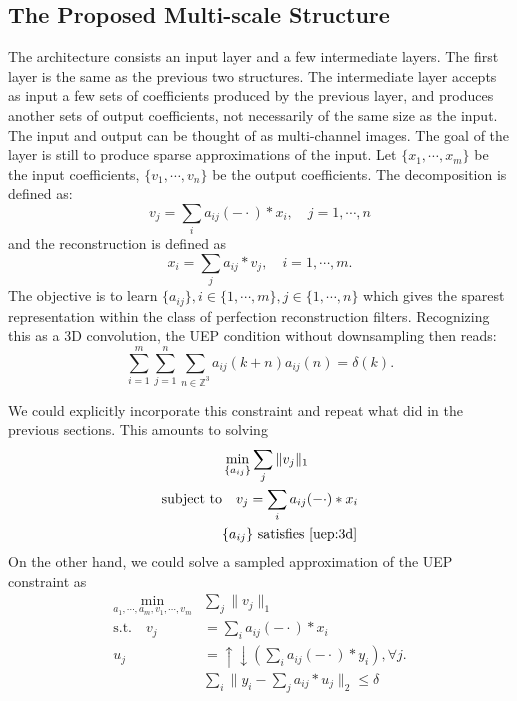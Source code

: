 \documentclass[a4paper]{article}
\begin{document}
\subsection{The Proposed Multi-scale Structure}
The architecture consists an input layer and a few intermediate layers. The first layer is the same as the previous two structures. The intermediate layer accepts as input a few sets of coefficients produced by the previous layer, and produces another sets of output coefficients, not necessarily of the same size as the input. The input and output can be thought of as multi-channel images. The goal of the layer is still to produce sparse approximations of the input. Let $\{x_1,\cdots,x_m\}$ be the input coefficients, $\{v_1,\cdots,v_n\}$ be the output coefficients. The decomposition is defined as:
\begin{equation}
	v_j = \sum_i a_{ij}(-\cdot)*x_i,\quad j=1,\cdots,n
\end{equation}
and the reconstruction is defined as 
\begin{equation}
	x_i = \sum_j a_{ij}*v_j, \quad i=1,\cdots, m.
\end{equation}
The objective is to learn $\{a_{ij}\}, i\in \{1,\cdots,m\}, j\in \{1,\cdots, n\}$ which gives the sparest representation within the class of perfection reconstruction filters. Recognizing this as a 3D convolution, the UEP condition without downsampling then reads:
\begin{equation}
\label{uep:3d}
	\sum_{i=1}^m\sum_{j=1}^n  \sum_{n\in \mathbb{Z}^3} a_{ij}(k+n)a_{ij}(n) = \delta(k).
\end{equation}

We could explicitly incorporate this constraint and repeat what did in the previous sections. This amounts to solving
\begin{equation}
	\begin{aligned}
		&\min_{ \{a_{ij}\} } \sum_j \|v_j\|_1 \\
		\textrm{subject to} &\quad v_j = \sum_i a_{ij}(-\cdot)*x_i \\
			&\{a_{ij}\} \textrm{ satisfies \eqref{uep:3d}} \\
	\end{aligned}
\end{equation}
On the other hand, we could solve a sampled approximation of the UEP constraint as
\begin{equation}
\label{eq:m3}
\begin{aligned}
	\min_{a_1,\cdots,a_m, v_1,\cdots,v_m}& \sum_j \|v_j\|_1 \\
	 \textrm{s.t.}  \quad v_j& = \sum_{i} a_{ij}(-\cdot)*x_i \\
		u_j&=\uparrow\downarrow(\sum_i a_{ij}(-\cdot)*y_i), \forall j. \\
		&\sum_i \|y_i - \sum_j a_{ij}*u_j\|_2 \leq \delta 
	\end{aligned}
\end{equation}
\end{document}

